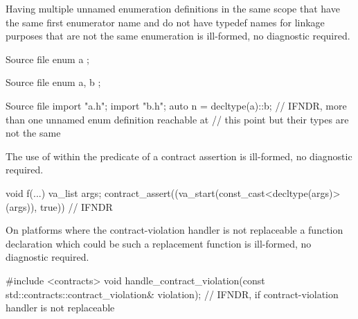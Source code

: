 
\pnum
Having multiple unnamed enumeration definitions
in the same scope
that have the same first enumerator name
and do not have typedef names for linkage purposes
that are not the same enumeration
is ill-formed, no diagnostic required.

\pnum
\begin{example}
\begin{codeblocktu}{Source file }
enum { a };
\end{codeblocktu}
\begin{codeblocktu}{Source file }
enum { a, b };
\end{codeblocktu}
\begin{codeblocktu}{Source file }
import "a.h";
import "b.h";
auto n = decltype(a)::b;        // IFNDR, more than one unnamed enum definition reachable at
                                // this point but their types are not the same
\end{codeblocktu}
\end{example}


\pnum
The use of 
within the predicate of a contract assertion
is ill-formed, no diagnostic required.

\pnum
\begin{example}
\begin{codeblock}
void f(...)
{
  va_list args;
  contract_assert((va_start(const_cast<decltype(args)>(args)), true))   // IFNDR
}
\end{codeblock}
\end{example}


\pnum
On platforms where
the contract-violation handler
is not replaceable
a function declaration which could be such a replacement function
is ill-formed, no diagnostic required.

\pnum
\begin{example}
\begin{codeblock}
#include <contracts>
void handle_contract_violation(const std::contracts::contract_violation& violation);
    // IFNDR, if contract-violation handler is not replaceable
\end{codeblock}
\end{example}

